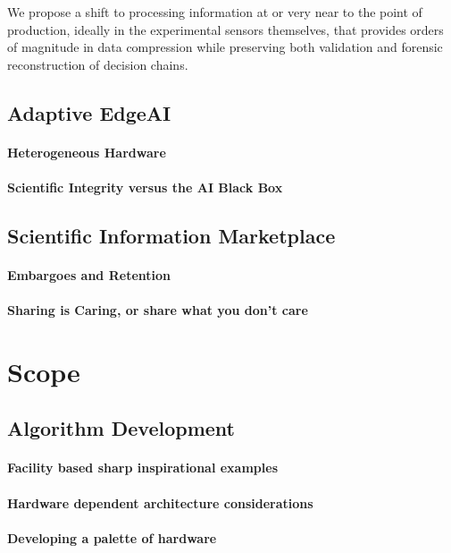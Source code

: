 \documentclass{article}
\begin{document}
We propose a shift to processing information at or very near to the point of production, ideally in the experimental sensors themselves, that provides orders of magnitude in data compression while preserving both validation and forensic reconstruction of decision chains.
\subsection{Adaptive EdgeAI}
\paragraph{Heterogeneous Hardware}
\paragraph{Scientific Integrity versus the AI Black Box}
\subsection{Scientific Information Marketplace}
\paragraph{Embargoes and Retention}
\paragraph{Sharing is Caring, or share what you don't care}

\section{Scope}

\subsection{Algorithm Development}
\paragraph{Facility based sharp inspirational examples}
\paragraph{Hardware dependent architecture considerations}
\paragraph{Developing a palette of hardware}
\end{document}
